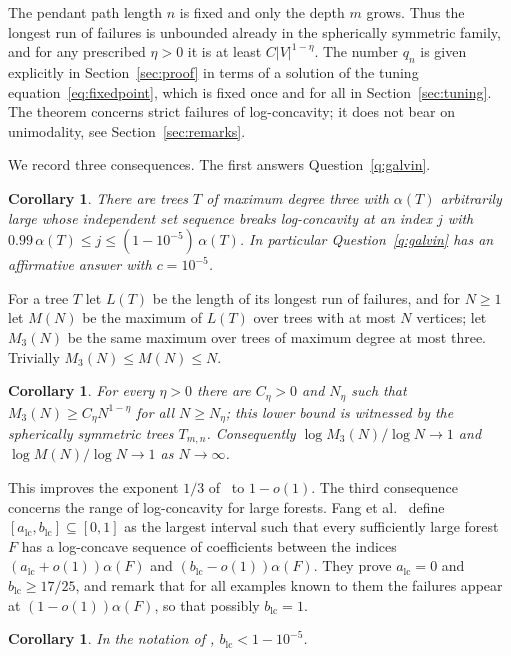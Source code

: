 \documentclass{amsart}
\newtheorem{corollary}[theorem]{Corollary}
\theoremstyle{definition}
\theoremstyle{remark}
\numberwithin{equation}{section}
\newcommand{\abs}[1]{\lvert #1\rvert}
\begin{document}
The pendant path length $n$ is fixed and only the depth $m$ grows. Thus the longest run of failures is unbounded already in the spherically symmetric family, and for any prescribed $\eta>0$ it is at least $C\abs{V}^{1-\eta}$. The number $q_n$ is given explicitly in Section~\ref{sec:proof} in terms of a solution of the tuning equation~\eqref{eq:fixedpoint}, which is fixed once and for all in Section~\ref{sec:tuning}. The theorem concerns strict failures of log-concavity; it does not bear on unimodality, see Section~\ref{sec:remarks}.

We record three consequences. The first answers Question~\ref{q:galvin}.

\begin{corollary}\label{cor:galvin}
There are trees $T$ of maximum degree three with $\alpha(T)$ arbitrarily large whose independent set sequence breaks log-concavity at an index $j$ with $0.99\,\alpha(T)\le j\le(1-10^{-5})\,\alpha(T)$. In particular Question~\ref{q:galvin} has an affirmative answer with $c=10^{-5}$.
\end{corollary}

For a tree $T$ let $L(T)$ be the length of its longest run of failures, and for $N\ge1$ let $M(N)$ be the maximum of $L(T)$ over trees with at most $N$ vertices; let $M_3(N)$ be the same maximum over trees of maximum degree at most three. Trivially $M_3(N)\le M(N)\le N$.

\begin{corollary}\label{cor:extremal}
For every $\eta>0$ there are $C_\eta>0$ and $N_\eta$ such that $M_3(N)\ge C_\eta N^{1-\eta}$ for all $N\ge N_\eta$; this lower bound is witnessed by the spherically symmetric trees $T_{m,n}$. Consequently $\log M_3(N)/\log N\to1$ and $\log M(N)/\log N\to1$ as $N\to\infty$.
\end{corollary}

This improves the exponent $1/3$ of~\cite{Yu26} to $1-o(1)$. The third consequence concerns the range of log-concavity for large forests. Fang et al.\ \cite[Section~9]{FLNYZ26} define $[a_{\mathrm{lc}},b_{\mathrm{lc}}]\subseteq[0,1]$ as the largest interval such that every sufficiently large forest $F$ has a log-concave sequence of coefficients between the indices $(a_{\mathrm{lc}}+o(1))\alpha(F)$ and $(b_{\mathrm{lc}}-o(1))\alpha(F)$. They prove $a_{\mathrm{lc}}=0$ and $b_{\mathrm{lc}}\ge 17/25$, and remark that for all examples known to them the failures appear at $(1-o(1))\alpha(F)$, so that possibly $b_{\mathrm{lc}}=1$.

\begin{corollary}\label{cor:blc}
In the notation of \cite[Section~9]{FLNYZ26}, $b_{\mathrm{lc}}<1-10^{-5}$.
\end{corollary}
\end{document}
